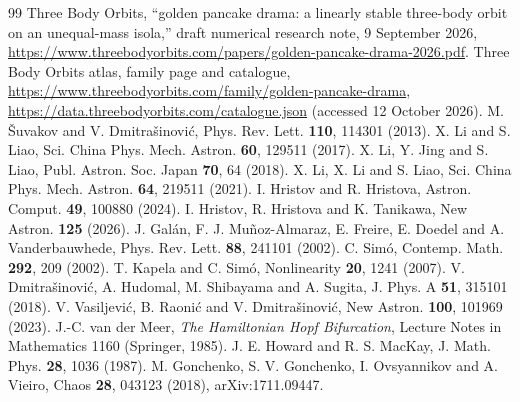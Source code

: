 \documentclass[10pt]{article}
\begin{document}
\begin{thebibliography}{99}\small
{} Three Body Orbits, ``golden pancake drama: a linearly stable three-body orbit on an unequal-mass isola,'' draft numerical research note, 9 September 2026, \url{https://www.threebodyorbits.com/papers/golden-pancake-drama-2026.pdf}.
 Three Body Orbits atlas, family page and catalogue, \url{https://www.threebodyorbits.com/family/golden-pancake-drama}, \url{https://data.threebodyorbits.com/catalogue.json} (accessed 12 October 2026).
 M. \v{S}uvakov and V. Dmitra\v{s}inovi\'c, Phys. Rev. Lett. \textbf{110}, 114301 (2013).
 X. Li and S. Liao, Sci. China Phys. Mech. Astron. \textbf{60}, 129511 (2017).
 X. Li, Y. Jing and S. Liao, Publ. Astron. Soc. Japan \textbf{70}, 64 (2018).
 X. Li, X. Li and S. Liao, Sci. China Phys. Mech. Astron. \textbf{64}, 219511 (2021).
 I. Hristov and R. Hristova, Astron. Comput. \textbf{49}, 100880 (2024).
 I. Hristov, R. Hristova and K. Tanikawa, New Astron. \textbf{125} (2026).
 J. Gal\'an, F. J. Mu\~noz-Almaraz, E. Freire, E. Doedel and A. Vanderbauwhede, Phys. Rev. Lett. \textbf{88}, 241101 (2002).
 C. Sim\'o, Contemp. Math. \textbf{292}, 209 (2002).
 T. Kapela and C. Sim\'o, Nonlinearity \textbf{20}, 1241 (2007).
 V. Dmitra\v{s}inovi\'c, A. Hudomal, M. Shibayama and A. Sugita, J. Phys. A \textbf{51}, 315101 (2018).
 V. Vasiljevi\'c, B. Raoni\'c and V. Dmitra\v{s}inovi\'c, New Astron. \textbf{100}, 101969 (2023).
 J.-C. van der Meer, \emph{The Hamiltonian Hopf Bifurcation}, Lecture Notes in Mathematics 1160 (Springer, 1985).
 J. E. Howard and R. S. MacKay, J. Math. Phys. \textbf{28}, 1036 (1987).
 M. Gonchenko, S. V. Gonchenko, I. Ovsyannikov and A. Vieiro, Chaos \textbf{28}, 043123 (2018), arXiv:1711.09447.
\end{thebibliography}
\end{document}
